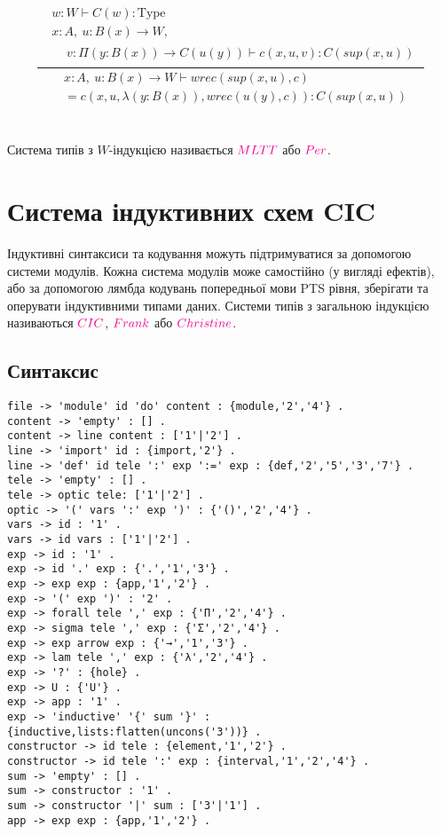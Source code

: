 \begin{equation}
\tag{$W$-$\beta$}
\dfrac{
  \begin{aligned}
    & w: W \vdash C(w) : \text{Type} \\
    & x: A,\ u: B(x) \rightarrow W, \\
    & \begin{aligned}
      & v: \Pi (y: B(x)) \rightarrow C(u(y)) \vdash c(x, u, v) : C(sup(x, u))
    \end{aligned}
  \end{aligned}
}{
  \begin{aligned}
    & x: A,\ u: B(x) \rightarrow W \vdash wrec(sup(x, u), c) \\
    & = c(x, u, \lambda (y: B(x)), wrec(u(y), c)) : C(sup(x, u))
  \end{aligned}
}
\end{equation}
\\
\\
\indent Система типів з $W$-індукцією називається $\textcolor{magenta}{MLTT}$ або $\textcolor{magenta}{Per}$.

\newpage
\section{Система індуктивних схем CIC}
Індуктивні синтаксиси та кодування можуть підтримуватися за допомогою системи модулів.
Кожна система модулів може самостійно (у вигляді ефектів), або за допомогою лямбда кодувань
попередньої мови PTS рівня, зберігати та оперувати індуктивними типами даних.
Системи типів з загальною індукцією називаються $\textcolor{magenta}{CIC}$,
$\textcolor{magenta}{Frank}$ або $\textcolor{magenta}{Christine}$.

\subsection*{Синтаксис}
\begin{lstlisting}[mathescape=true]
file -> 'module' id 'do' content : {module,'2','4'} .
content -> 'empty' : [] .
content -> line content : ['1'|'2'] .
line -> 'import' id : {import,'2'} .
line -> 'def' id tele ':' exp ':=' exp : {def,'2','5','3','7'} .
tele -> 'empty' : [] .
tele -> optic tele: ['1'|'2'] .
optic -> '(' vars ':' exp ')' : {'()','2','4'} .
vars -> id : '1' .
vars -> id vars : ['1'|'2'] .
exp -> id : '1' .
exp -> id '.' exp : {'.','1','3'} .
exp -> exp exp : {app,'1','2'} .
exp -> '(' exp ')' : '2' .
exp -> forall tele ',' exp : {'Π','2','4'} .
exp -> sigma tele ',' exp : {'Σ','2','4'} .
exp -> exp arrow exp : {'→','1','3'} .
exp -> lam tele ',' exp : {'λ','2','4'} .
exp -> '?' : {hole} .
exp -> U : {'U'} .
exp -> app : '1' .
exp -> 'inductive' '{' sum '}' : {inductive,lists:flatten(uncons('3'))} .
constructor -> id tele : {element,'1','2'} .
constructor -> id tele ':' exp : {interval,'1','2','4'} .
sum -> 'empty' : [] .
sum -> constructor : '1' .
sum -> constructor '|' sum : ['3'|'1'] .
app -> exp exp : {app,'1','2'} .
\end{lstlisting}

